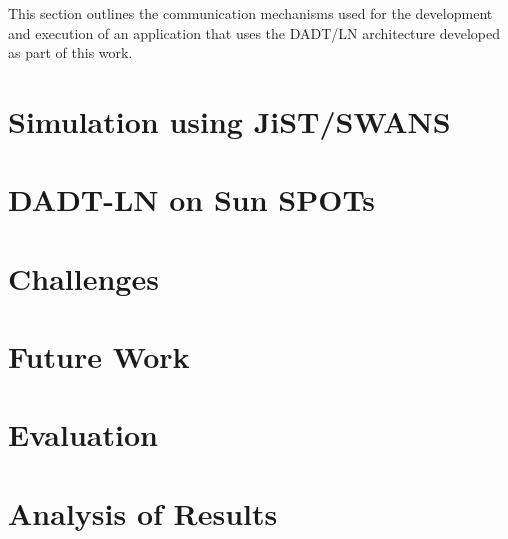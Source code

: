 This section outlines the communication mechanisms used for the development and
execution of an application that uses the DADT/LN architecture developed as part
of this work.



\section{Simulation using JiST/SWANS}

\section{DADT-LN on Sun SPOTs}

\section{Challenges}

\section{Future Work}

\section{Evaluation}

\section{Analysis of Results}


